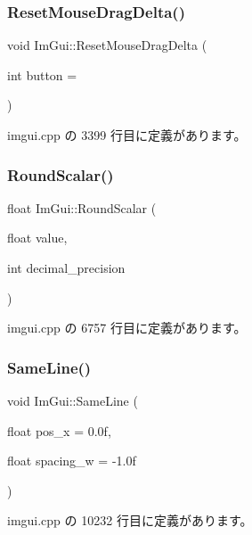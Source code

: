 \subsubsection{\texorpdfstring{Reset\+Mouse\+Drag\+Delta()}{ResetMouseDragDelta()}}
{\footnotesize\ttfamily void Im\+Gui\+::\+Reset\+Mouse\+Drag\+Delta (\begin{DoxyParamCaption}\item[{int}]{button = {} }\end{DoxyParamCaption})}



 imgui.\+cpp の 3399 行目に定義があります。

\mbox{\label{namespace_im_gui_ab1826c569a8f3296b9723a2148013d28}} 
\subsubsection{\texorpdfstring{Round\+Scalar()}{RoundScalar()}}
{\footnotesize\ttfamily float Im\+Gui\+::\+Round\+Scalar (\begin{DoxyParamCaption}\item[{float}]{value,  }\item[{int}]{decimal\+\_\+precision }\end{DoxyParamCaption})}



 imgui.\+cpp の 6757 行目に定義があります。

\mbox{\label{namespace_im_gui_a9a01bed1445b5b7edaf0af6a31c08d2c}} 
\subsubsection{\texorpdfstring{Same\+Line()}{SameLine()}}
{\footnotesize\ttfamily void Im\+Gui\+::\+Same\+Line (\begin{DoxyParamCaption}\item[{float}]{pos\+\_\+x = {\ttfamily 0.0f},  }\item[{float}]{spacing\+\_\+w = {\ttfamily -\/1.0f} }\end{DoxyParamCaption})}



 imgui.\+cpp の 10232 行目に定義があります。

